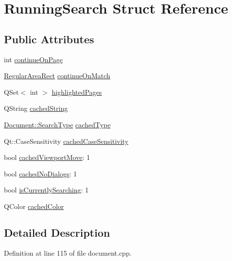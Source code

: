 \hypertarget{structRunningSearch}{\section{Running\+Search Struct Reference}
\label{structRunningSearch}
}
\subsection*{Public Attributes}
\begin{DoxyCompactItemize}
\item 
int \hyperlink{structRunningSearch_a69213b1663cb154fee0cca4b877c4c05}{continue\+On\+Page}
\item 
\hyperlink{classOkular_1_1RegularAreaRect}{Regular\+Area\+Rect} \hyperlink{structRunningSearch_acd3938eb8c9ccc97de83af80d68e55bf}{continue\+On\+Match}
\item 
Q\+Set$<$ int $>$ \hyperlink{structRunningSearch_a5827c4228354199d0a4447dca7f19fb1}{highlighted\+Pages}
\item 
Q\+String \hyperlink{structRunningSearch_aeed5bd658d162c7650b2e4cb315df054}{cached\+String}
\item 
\hyperlink{classOkular_1_1Document_af4b4b32563d6013d6da10be1667a7bad}{Document\+::\+Search\+Type} \hyperlink{structRunningSearch_a1b4026cf76ef3dce1f2b8b831670d784}{cached\+Type}
\item 
Qt\+::\+Case\+Sensitivity \hyperlink{structRunningSearch_a18e388eb59284584e8bd1f514ef7eaf5}{cached\+Case\+Sensitivity}
\item 
bool \hyperlink{structRunningSearch_a82fb2c89035371061b259d4f1b62ff35}{cached\+Viewport\+Move}\+: 1
\item 
bool \hyperlink{structRunningSearch_a407eed15ba7e4e73db19b37bda4cf4c1}{cached\+No\+Dialogs}\+: 1
\item 
bool \hyperlink{structRunningSearch_a2683a901cf457f541ca4662294e02cec}{is\+Currently\+Searching}\+: 1
\item 
Q\+Color \hyperlink{structRunningSearch_ab49ca5b36bab91976e99620b0701fffe}{cached\+Color}
\end{DoxyCompactItemize}


\subsection{Detailed Description}


Definition at line 115 of file document.\+cpp.



